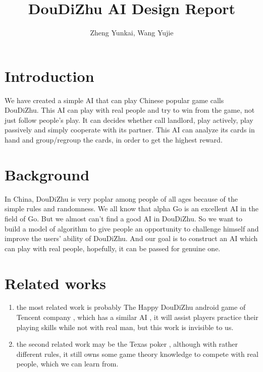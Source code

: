 \documentclass[a4paper,man,natbib]{apa6}
\title{DouDiZhu AI Design Report}
\author{Zheng Yunkai, Wang Yujie}
\affiliation{516030910490. 516030910486}
\begin{document}
\maketitle

\section{Introduction}

We have created a simple AI that can play Chinese popular game calls DouDiZhu. This AI can play with real people and try to win from the game, not just follow people’s play. It can decides whether call landlord, play actively, play passively and simply cooperate with its partner. This AI can analyze its cards in hand and group/regroup the cards, in order to get the highest reward.


\section{Background}

In China, DouDiZhu is very poplar among people of all ages because of the simple rules and randomness. We all know that alpha Go is an excellent AI in the field of Go. But we almost can’t find a good AI in DouDiZhu. So we want to build a model of algorithm to give people an opportunity to challenge himself and improve the users’ ability of DouDiZhu. And our goal is to construct an AI which can play with real people, hopefully, it can be passed for genuine one.


\section{Related works}

\begin{enumerate}
\item the most related work is probably The  Happy DouDiZhu android game of Tencent company , which has a similar AI , it will assist players practice their playing skills while not with real man, but this work is invisible to us. 
\item  the second related work may be the Texas poker , although with rather different rules, it still owns  some game theory knowledge to compete with real people, which we can learn from.
\end{enumerate}
\end{document}
